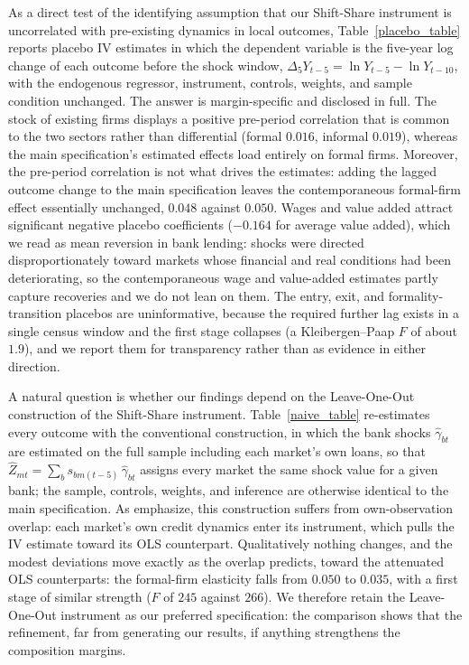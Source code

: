 \documentclass[12pt]{article}
\begin{document}
As a direct test of the identifying assumption that our Shift-Share instrument is uncorrelated with pre-existing dynamics in local outcomes, Table~\ref{placebo_table} reports placebo IV estimates in which the dependent variable is the five-year log change of each outcome before the shock window, $\Delta_5 Y_{t-5} = \ln Y_{t-5} - \ln Y_{t-10}$, with the endogenous regressor, instrument, controls, weights, and sample condition unchanged. The answer is margin-specific and disclosed in full. The stock of existing firms displays a positive pre-period correlation that is common to the two sectors rather than differential (formal $0.016$, informal $0.019$), whereas the main specification's estimated effects load entirely on formal firms. Moreover, the pre-period correlation is not what drives the estimates: adding the lagged outcome change to the main specification leaves the contemporaneous formal-firm effect essentially unchanged, $0.048$ against $0.050$. Wages and value added attract significant negative placebo coefficients ($-0.164$ for average value added), which we read as mean reversion in bank lending: shocks were directed disproportionately toward markets whose financial and real conditions had been deteriorating, so the contemporaneous wage and value-added estimates partly capture recoveries and we do not lean on them. The entry, exit, and formality-transition placebos are uninformative, because the required further lag exists in a single census window and the first stage collapses (a Kleibergen--Paap $F$ of about $1.9$), and we report them for transparency rather than as evidence in either direction.

A natural question is whether our findings depend on the Leave-One-Out construction of the Shift-Share instrument. Table~\ref{naive_table} re-estimates every outcome with the conventional construction, in which the bank shocks $\hat{\gamma}_{bt}$ are estimated on the full sample including each market's own loans, so that $\hat{Z}_{mt} = \sum_b s_{bm(t-5)}\,\hat{\gamma}_{bt}$ assigns every market the same shock value for a given bank; the sample, controls, weights, and inference are otherwise identical to the main specification. As \citet{borusyak2022quasi} emphasize, this construction suffers from own-observation overlap: each market's own credit dynamics enter its instrument, which pulls the IV estimate toward its OLS counterpart. Qualitatively nothing changes, and the modest deviations move exactly as the overlap predicts, toward the attenuated OLS counterparts: the formal-firm elasticity falls from $0.050$ to $0.035$, with a first stage of similar strength ($F$ of $245$ against $266$). We therefore retain the Leave-One-Out instrument as our preferred specification: the comparison shows that the refinement, far from generating our results, if anything strengthens the composition margins.
\end{document}
